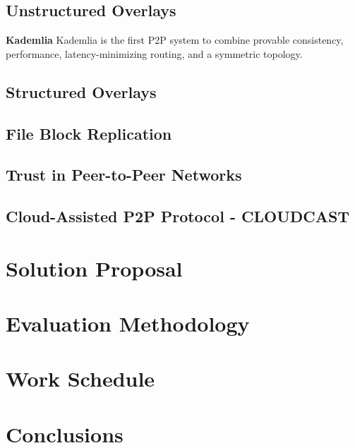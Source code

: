 \documentclass[runningheads]{llncs}
\begin{document}
\subsection{Unstructured Overlays}
\textbf{Kademlia} Kademlia is the first P2P system to combine provable consistency, performance, latency-minimizing routing, and a symmetric topology. \cite{kademlia}
\subsection{Structured Overlays}
\subsection{File Block Replication}
\subsection{Trust in Peer-to-Peer Networks}
\subsection{Cloud-Assisted P2P Protocol - CLOUDCAST}

\newpage\section{Solution Proposal}\label{sec:proposal}

\section{Evaluation Methodology}\label{sec:methodology}

\section{Work Schedule}\label{sec:workschedule}

\section{Conclusions}\label{sec:conclusion}



\end{document}
